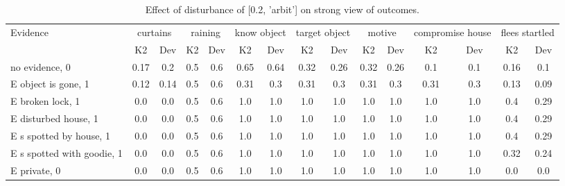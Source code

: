 \begin{table}\begin{tabular}{l|cc|cc|cc|cc|cc|cc|cc}\toprule\multirow{2}{*}{Evidence} & \multicolumn{2}{c}{curtains}& \multicolumn{2}{c}{raining}& \multicolumn{2}{c}{know object}& \multicolumn{2}{c}{target object}& \multicolumn{2}{c}{motive}& \multicolumn{2}{c}{compromise house}& \multicolumn{2}{c}{flees startled}\\& {K2} & {Dev}& {K2} & {Dev}& {K2} & {Dev}& {K2} & {Dev}& {K2} & {Dev}& {K2} & {Dev}& {K2} & {Dev}\\\midrule
no evidence, 0 & 0.17&0.2&\cellcolor{Bittersweet}0.5&\cellcolor{Bittersweet}0.6&0.65&0.64&\cellcolor{Bittersweet}0.32&\cellcolor{Bittersweet}0.26&\cellcolor{Bittersweet}0.32&\cellcolor{Bittersweet}0.26&0.1&0.1&\cellcolor{Bittersweet}0.16&\cellcolor{Bittersweet}0.1\\E object is gone, 1 & 0.12&0.14&\cellcolor{Bittersweet}0.5&\cellcolor{Bittersweet}0.6&0.31&0.3&0.31&0.3&0.31&0.3&0.31&0.3&0.13&0.09\\E broken lock, 1 & 0.0&0.0&\cellcolor{Bittersweet}0.5&\cellcolor{Bittersweet}0.6&1.0&1.0&1.0&1.0&1.0&1.0&1.0&1.0&\cellcolor{Bittersweet}0.4&\cellcolor{Bittersweet}0.29\\E disturbed house, 1 & 0.0&0.0&\cellcolor{Bittersweet}0.5&\cellcolor{Bittersweet}0.6&1.0&1.0&1.0&1.0&1.0&1.0&1.0&1.0&\cellcolor{Bittersweet}0.4&\cellcolor{Bittersweet}0.29\\E s spotted by house, 1 & 0.0&0.0&\cellcolor{Bittersweet}0.5&\cellcolor{Bittersweet}0.6&1.0&1.0&1.0&1.0&1.0&1.0&1.0&1.0&\cellcolor{Bittersweet}0.4&\cellcolor{Bittersweet}0.29\\E s spotted with goodie, 1 & 0.0&0.0&\cellcolor{Bittersweet}0.5&\cellcolor{Bittersweet}0.6&1.0&1.0&1.0&1.0&1.0&1.0&1.0&1.0&\cellcolor{Bittersweet}0.32&\cellcolor{Bittersweet}0.24\\E private, 0 & 0.0&0.0&\cellcolor{Bittersweet}0.5&\cellcolor{Bittersweet}0.6&1.0&1.0&1.0&1.0&1.0&1.0&1.0&1.0&0.0&0.0\\\bottomrule\end{tabular}\caption{Effect of disturbance of [0.2, 'arbit'] on strong view of outcomes.}\end{table}
